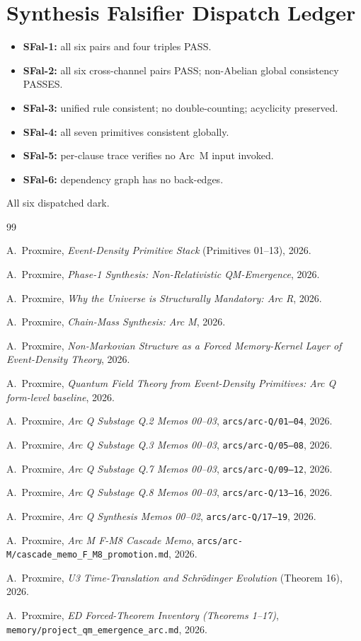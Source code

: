 \documentclass[11pt,a4paper]{article}
\begin{document}
\section{Synthesis Falsifier Dispatch Ledger}

\begin{itemize}[leftmargin=1.5em]
  \item \textbf{SFal-1:} all six pairs and four triples PASS.
  \item \textbf{SFal-2:} all six cross-channel pairs PASS; non-Abelian global consistency PASSES.
  \item \textbf{SFal-3:} unified rule consistent; no double-counting; acyclicity preserved.
  \item \textbf{SFal-4:} all seven primitives consistent globally.
  \item \textbf{SFal-5:} per-clause trace verifies no Arc~M input invoked.
  \item \textbf{SFal-6:} dependency graph has no back-edges.
\end{itemize}
All six dispatched dark.

\begin{thebibliography}{99}

A.~Proxmire, \emph{Event-Density Primitive Stack} (Primitives 01--13), 2026.

A.~Proxmire, \emph{Phase-1 Synthesis: Non-Relativistic QM-Emergence}, 2026.

A.~Proxmire, \emph{Why the Universe is Structurally Mandatory: Arc R}, 2026.

A.~Proxmire, \emph{Chain-Mass Synthesis: Arc M}, 2026.

A.~Proxmire, \emph{Non-Markovian Structure as a Forced Memory-Kernel Layer of Event-Density Theory}, 2026.

A.~Proxmire, \emph{Quantum Field Theory from Event-Density Primitives: Arc Q form-level baseline}, 2026.

A.~Proxmire, \emph{Arc Q Substage Q.2 Memos 00--03}, \texttt{arcs/arc-Q/01--04}, 2026.

A.~Proxmire, \emph{Arc Q Substage Q.3 Memos 00--03}, \texttt{arcs/arc-Q/05--08}, 2026.

A.~Proxmire, \emph{Arc Q Substage Q.7 Memos 00--03}, \texttt{arcs/arc-Q/09--12}, 2026.

A.~Proxmire, \emph{Arc Q Substage Q.8 Memos 00--03}, \texttt{arcs/arc-Q/13--16}, 2026.

A.~Proxmire, \emph{Arc Q Synthesis Memos 00--02}, \texttt{arcs/arc-Q/17--19}, 2026.

A.~Proxmire, \emph{Arc M F-M8 Cascade Memo}, \texttt{arcs/arc-M/cascade\_memo\_F\_M8\_promotion.md}, 2026.

A.~Proxmire, \emph{U3 Time-Translation and Schr\"odinger Evolution} (Theorem 16), 2026.

A.~Proxmire, \emph{ED Forced-Theorem Inventory (Theorems 1--17)}, \texttt{memory/project\_qm\_emergence\_arc.md}, 2026.

\end{thebibliography}
\end{document}
